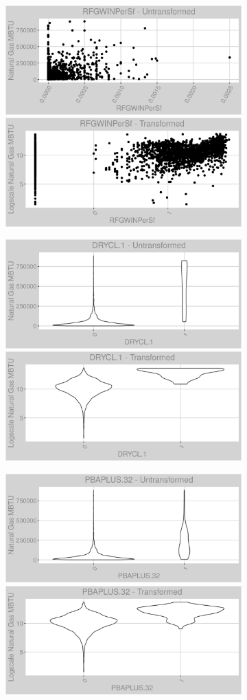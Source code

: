 \FloatBarrier
\newpage
\begin{figure}
\centering
\begin{subfigure}{1\textwidth}
\centering
\includegraphics[width=.49\textwidth, height=0.3\textheight]{Images/natural_gas_psf_var_original_3.png}
\includegraphics[width=.49\textwidth, height=0.3\textheight]{Images/natural_gas_psf_var_transformed_3.png}
\end{subfigure}
\begin{subfigure}{1\textwidth}
\centering
\includegraphics[width=.49\textwidth, height=0.3\textheight]{Images/natural_gas_psf_var_original_4.png}
\includegraphics[width=.49\textwidth, height=0.3\textheight]{Images/natural_gas_psf_var_transformed_4.png}
\end{subfigure}
\begin{subfigure}{1\textwidth}
\centering
\includegraphics[width=.49\textwidth, height=0.3\textheight]{Images/natural_gas_psf_var_original_5.png}
\includegraphics[width=.49\textwidth, height=0.3\textheight]{Images/natural_gas_psf_var_transformed_5.png}
\end{subfigure}
\end{figure}
